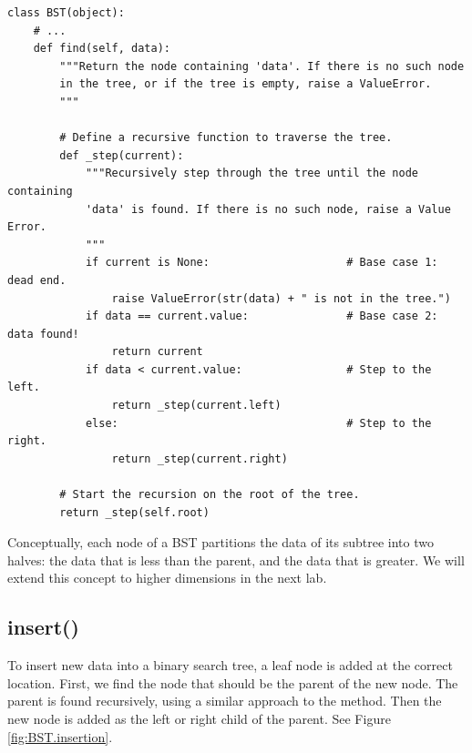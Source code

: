\begin{lstlisting}
class BST(object):
    # ...
    def find(self, data):
        """Return the node containing 'data'. If there is no such node
        in the tree, or if the tree is empty, raise a ValueError.
        """

        # Define a recursive function to traverse the tree.
        def _step(current):
            """Recursively step through the tree until the node containing
            'data' is found. If there is no such node, raise a Value Error.
            """
            if current is None:                     # Base case 1: dead end.
                raise ValueError(str(data) + " is not in the tree.")
            if data == current.value:               # Base case 2: data found!
                return current
            if data < current.value:                # Step to the left.
                return _step(current.left)
            else:                                   # Step to the right.
                return _step(current.right)
        
        # Start the recursion on the root of the tree.
        return _step(self.root)
\end{lstlisting}

\begin{info}
Conceptually, each node of a BST partitions the data of its subtree into two halves: the data that is less than the parent, and the data that is greater.
We will extend this concept to higher dimensions in the next lab.
\end{info}

\subsection*{insert()}

To insert new data into a binary search tree, a leaf node is added at the correct location.
First, we find the node that should be the parent of the new node.
The parent is found recursively, using a similar approach to the  method.
Then the new node is added as the left or right child of the parent.
See Figure \ref{fig:BST.insertion}.

